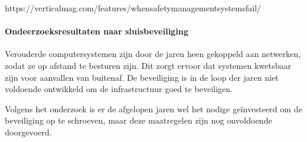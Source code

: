\cite{fulvio1993safetycriticalsystems}
\cite{dlrtabid}
\cite{knight2010SafetyCritical}
\cite{creavisafecritical}
\cite{valdes2018SafetybyAutomation}

https://verticalmag.com/features/whensafetymanagementsystemsfail/
\cite{2015whensafetymanagementsystemsfail}
\paragraph{Ondeerzoeksresultaten naar sluisbeveiliging}



Verouderde computersystemen zijn door de jaren heen gekoppeld aan netwerken, zodat ze op afstand te besturen zijn. Dit zorgt ervoor dat systemen kwetsbaar zijn voor aanvallen van buitenaf. De beveiliging is in de loop der jaren niet voldoende ontwikkeld om de infrastructuur goed te beveiligen.

Volgens het onderzoek is er de afgelopen jaren wel het nodige geïnvesteerd om de beveiliging op te schroeven, maar deze maatregelen zijn nog onvoldoende doorgevoerd.

